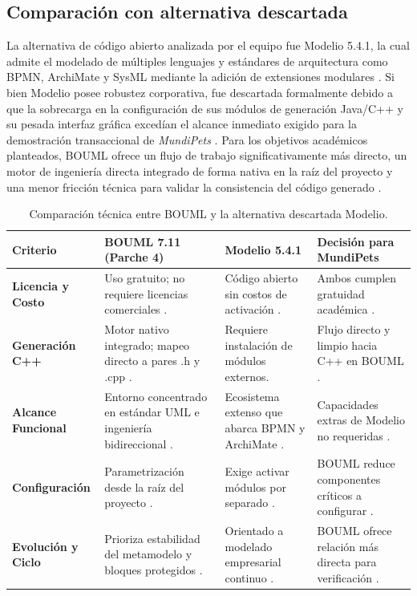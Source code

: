 \documentclass[journal,onecolumn]{IEEEtran}
\begin{document}
	\subsection{Comparación con alternativa descartada}
	La alternativa de código abierto analizada por el equipo fue Modelio 5.4.1, la cual admite el modelado de múltiples lenguajes y estándares de arquitectura como BPMN, ArchiMate y SysML mediante la adición de extensiones modulares \cite{Modelio2026}. Si bien Modelio posee robustez corporativa, fue descartada formalmente debido a que la sobrecarga en la configuración de sus módulos de generación Java/C++ y su pesada interfaz gráfica excedían el alcance inmediato exigido para la demostración transaccional de \textit{MundiPets} \cite{GuiaMDD2026}. Para los objetivos académicos planteados, BOUML ofrece un flujo de trabajo significativamente más directo, un motor de ingeniería directa integrado de forma nativa en la raíz del proyecto y una menor fricción técnica para validar la consistencia del código generado \cite{BOUMLFeatures2026, GuiaMDD2026}.
	
	\begin{table}[H]
		\caption{Comparación técnica entre BOUML y la alternativa descartada Modelio.}
		\label{tab:comparacion_herramientas}
		\centering
		\renewcommand{\arraystretch}{1.2}
		\begin{tabularx}{\linewidth}{|l|X|X|X|}
			\hline
			\textbf{Criterio} & \textbf{BOUML 7.11 (Parche 4)} & \textbf{Modelio 5.4.1} & \textbf{Decisión para MundiPets} \\
			\hline
			\textbf{Licencia y Costo} & Uso gratuito; no requiere licencias comerciales \cite{BOUML2025}. & Código abierto sin costos de activación \cite{Modelio2026}. & Ambos cumplen gratuidad académica \cite{GuiaMDD2026}. \\ \hline
			\textbf{Generación C++} & Motor nativo integrado; mapeo directo a pares .h y .cpp \cite{BOUMLFeatures2026}. & Requiere instalación de módulos externos. & Flujo directo y limpio hacia C++ en BOUML \cite{BOUMLFeatures2026}. \\ \hline
			\textbf{Alcance Funcional} & Entorno concentrado en estándar UML e ingeniería bidireccional \cite{BOUMLFeatures2026}. & Ecosistema extenso que abarca BPMN y ArchiMate \cite{Modelio2026}. & Capacidades extras de Modelio no requeridas \cite{GuiaMDD2026}. \\ \hline
			\textbf{Configuración} & Parametrización desde la raíz del proyecto \cite{BOUMLFeatures2026}. & Exige activar módulos por separado \cite{Modelio2026}. & BOUML reduce componentes críticos a configurar \cite{GuiaMDD2026}. \\ \hline
			\textbf{Evolución y Ciclo} & Prioriza estabilidad del metamodelo y bloques protegidos \cite{BOUMLFeatures2026}. & Orientado a modelado empresarial continuo \cite{Modelio2026}. & BOUML ofrece relación más directa para verificación \cite{GuiaMDD2026}. \\
			\hline
		\end{tabularx}
	\end{table}
	
\end{document}
